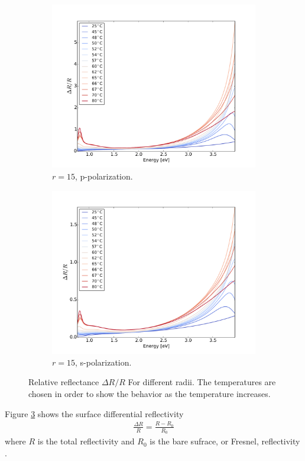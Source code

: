 \begin{figure}[h!]
    \begin{subfigure}[b]{0.49\textwidth}
        \centering
        \includegraphics[width=\textwidth]{Results/Sim3/dR.pdf}
        \caption{$r = 15$, p-polarization.}
        \label{fig:dR15p}
    \end{subfigure}
    \begin{subfigure}[b]{0.49\textwidth}
        \centering
        \includegraphics[width=\textwidth]{Results/Sim4/dR.pdf}
        \caption{$r = 15$, s-polarization.}
        \label{fig:dR15s}
    \end{subfigure}
    \caption{Relative reflectance $\Delta R/R$ For different radii. The temperatures are chosen in order to
    show the behavior as the temperature increases.}
    \label{fig:dR}
\end{figure}
%
Figure \ref{fig:dR} shows the surface differential reflectivity
\begin{align}
   \frac{\Delta R}{R} = \frac{R-R_0}{R_0}
\end{align}
where $R$ is the total reflectivity and $R_0$ is the bare sufrace, or Fresnel, reflectivity \cite{Lazzari2001}.

